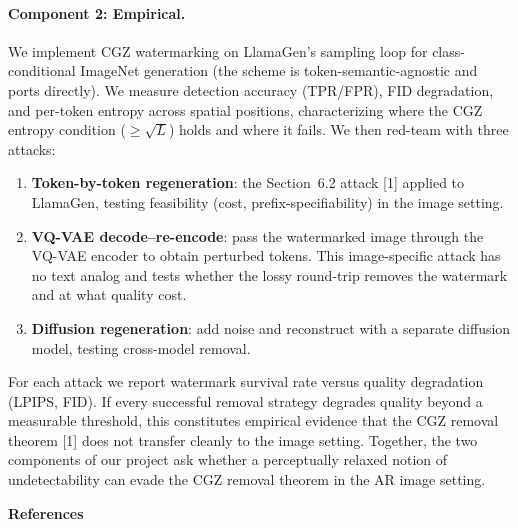 \documentclass[10pt]{article}
\begin{document}
\paragraph{Component 2: Empirical.}
We implement CGZ watermarking on LlamaGen's sampling loop for class-conditional ImageNet generation (the scheme is token-semantic-agnostic and ports directly). We measure detection accuracy (TPR/FPR), FID degradation, and per-token entropy across spatial positions, characterizing where the CGZ entropy condition ($\geq\!\sqrt{L}$) holds and where it fails. We then red-team with three attacks:
\begin{enumerate}[leftmargin=*,nosep,topsep=2pt]
  \item \textbf{Token-by-token regeneration}: the Section~6.2 attack [1] applied to LlamaGen, testing feasibility (cost, prefix-specifiability) in the image setting.
  \item \textbf{VQ-VAE decode--re-encode}: pass the watermarked image through the VQ-VAE encoder to obtain perturbed tokens. This image-specific attack has no text analog and tests whether the lossy round-trip removes the watermark and at what quality cost.
  \item \textbf{Diffusion regeneration}: add noise and reconstruct with a separate diffusion model, testing cross-model removal.
\end{enumerate}
For each attack we report watermark survival rate versus quality degradation (LPIPS, FID). If every successful removal strategy degrades quality beyond a measurable threshold, this constitutes empirical evidence that the CGZ removal theorem [1] does not transfer cleanly to the image setting. Together, the two components of our project ask whether a perceptually relaxed notion of undetectability can evade the CGZ removal theorem 
in the AR image setting.

\vspace{0.2em}
\noindent\textbf{References}\par\vspace{0.1em}
\end{document}
